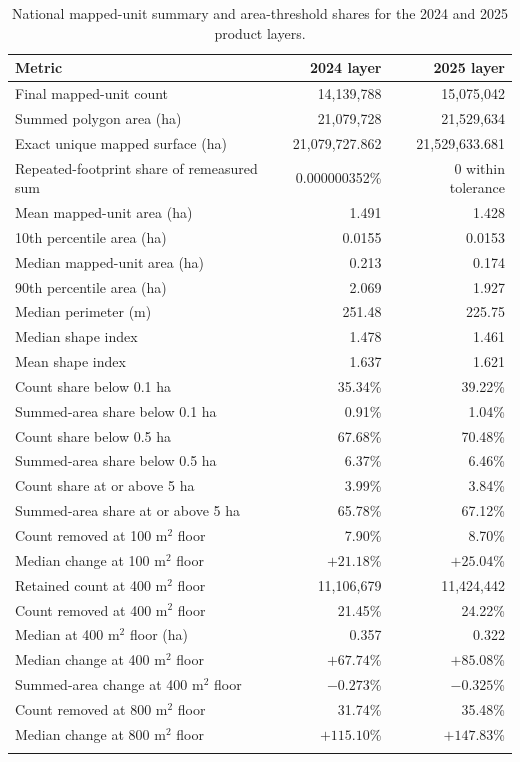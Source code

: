 \documentclass[pdflatex,sn-basic]{sn-jnl}
\begin{document}
\begin{table}[t]
\caption{National mapped-unit summary and area-threshold shares for the 2024 and 2025 product layers.}\label{tab:national}
\centering
\begin{tabularx}{\textwidth}{@{}Yrr@{}}
\toprule
Metric & 2024 layer & 2025 layer \\
\midrule
Final mapped-unit count & 14,139,788 & 15,075,042 \\
Summed polygon area (ha) & 21,079,728 & 21,529,634 \\
Exact unique mapped surface (ha) & 21,079,727.862 & 21,529,633.681 \\
Repeated-footprint share of remeasured sum & 0.000000352\% & 0 within tolerance \\
Mean mapped-unit area (ha) & 1.491 & 1.428 \\
10th percentile area (ha) & 0.0155 & 0.0153 \\
Median mapped-unit area (ha) & 0.213 & 0.174 \\
90th percentile area (ha) & 2.069 & 1.927 \\
Median perimeter (m) & 251.48 & 225.75 \\
Median shape index & 1.478 & 1.461 \\
Mean shape index & 1.637 & 1.621 \\
Count share below 0.1 ha & 35.34\% & 39.22\% \\
Summed-area share below 0.1 ha & 0.91\% & 1.04\% \\
Count share below 0.5 ha & 67.68\% & 70.48\% \\
Summed-area share below 0.5 ha & 6.37\% & 6.46\% \\
Count share at or above 5 ha & 3.99\% & 3.84\% \\
Summed-area share at or above 5 ha & 65.78\% & 67.12\% \\
Count removed at 100 m$^{2}$ floor & 7.90\% & 8.70\% \\
Median change at 100 m$^{2}$ floor & $+21.18$\% & $+25.04$\% \\
Retained count at 400 m$^{2}$ floor & 11,106,679 & 11,424,442 \\
Count removed at 400 m$^{2}$ floor & 21.45\% & 24.22\% \\
Median at 400 m$^{2}$ floor (ha) & 0.357 & 0.322 \\
Median change at 400 m$^{2}$ floor & $+67.74$\% & $+85.08$\% \\
Summed-area change at 400 m$^{2}$ floor & $-0.273$\% & $-0.325$\% \\
Count removed at 800 m$^{2}$ floor & 31.74\% & 35.48\% \\
Median change at 800 m$^{2}$ floor & $+115.10$\% & $+147.83$\% \\
\botrule
\end{tabularx}
\end{table}
\end{document}
